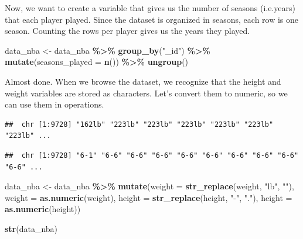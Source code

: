 \documentclass[
]{book}
\newenvironment{Shaded}{\begin{snugshade}}{\end{snugshade}}
\newcommand{\AttributeTok}[1]{\textcolor[rgb]{0.13,0.29,0.53}{#1}}
\newcommand{\FunctionTok}[1]{\textcolor[rgb]{0.13,0.29,0.53}{\textbf{#1}}}
\newcommand{\NormalTok}[1]{#1}
\newcommand{\OtherTok}[1]{\textcolor[rgb]{0.56,0.35,0.01}{#1}}
\newcommand{\SpecialCharTok}[1]{\textcolor[rgb]{0.81,0.36,0.00}{\textbf{#1}}}
\newcommand{\StringTok}[1]{\textcolor[rgb]{0.31,0.60,0.02}{#1}}
\begin{document}
Now, we want to create a variable that gives us the number of seasons (i.e.years)
that each player played. Since the dataset is organized in seasons, each row
is one season. Counting the rows per player gives us the years they played.

\begin{Shaded}
\begin{Highlighting}[]
\NormalTok{data\_nba }\OtherTok{\textless{}{-}}\NormalTok{ data\_nba }\SpecialCharTok{\%\textgreater{}\%}
  \FunctionTok{group\_by}\NormalTok{(}\StringTok{"\_id"}\NormalTok{) }\SpecialCharTok{\%\textgreater{}\%}
  \FunctionTok{mutate}\NormalTok{(}\AttributeTok{seasons\_played =} \FunctionTok{n}\NormalTok{()) }\SpecialCharTok{\%\textgreater{}\%}
  \FunctionTok{ungroup}\NormalTok{()}
\end{Highlighting}
\end{Shaded}

Almost done. When we browse the dataset, we recognize that the height and weight variables are stored as characters. Let's convert them to numeric, so we can
use them in operations.

\begin{Shaded}
\end{Shaded}

\begin{verbatim}
##  chr [1:9728] "162lb" "223lb" "223lb" "223lb" "223lb" "223lb" "223lb" ...
\end{verbatim}

\begin{Shaded}
\end{Shaded}

\begin{verbatim}
##  chr [1:9728] "6-1" "6-6" "6-6" "6-6" "6-6" "6-6" "6-6" "6-6" "6-6" "6-6" ...
\end{verbatim}

\begin{Shaded}
\begin{Highlighting}[]
\NormalTok{data\_nba }\OtherTok{\textless{}{-}}\NormalTok{ data\_nba }\SpecialCharTok{\%\textgreater{}\%}
  \FunctionTok{mutate}\NormalTok{(}\AttributeTok{weight =} \FunctionTok{str\_replace}\NormalTok{(weight, }\StringTok{"lb"}\NormalTok{, }\StringTok{""}\NormalTok{),}
         \AttributeTok{weight =} \FunctionTok{as.numeric}\NormalTok{(weight),}
         \AttributeTok{height =} \FunctionTok{str\_replace}\NormalTok{(height, }\StringTok{"{-}"}\NormalTok{, }\StringTok{"."}\NormalTok{),}
         \AttributeTok{height =} \FunctionTok{as.numeric}\NormalTok{(height))}

\FunctionTok{str}\NormalTok{(data\_nba)}
\end{Highlighting}
\end{Shaded}
\end{document}
